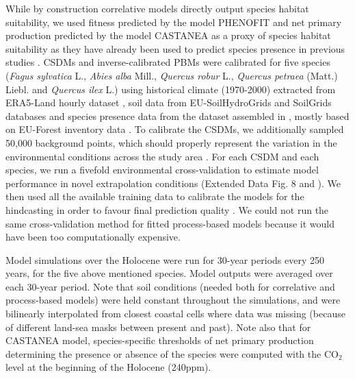 \documentclass[pdflatex, sn-nature]{sn-jnl}%
\newcommand{\textappr}{\raisebox{0.5ex}{\texttildelow}} %
\begin{document}
While by construction correlative models directly output species habitat suitability, we used fitness predicted by the model PHENOFIT and net primary production predicted by the model CASTANEA as a proxy of species habitat suitability as they have already been used to predict species presence in previous studies \cite{Morin2009, Cheaib2012, Saltre2013}. 
CSDMs and inverse-calibrated PBMs were calibrated for five species (\textit{Fagus sylvatica} L., \textit{Abies alba} Mill., \textit{Quercus robur} L., \textit{Quercus petraea}  (Matt.) Liebl. and \textit{Quercus ilex} L.) using historical climate (1970-2000) extracted from ERA5-Land hourly dataset \cite{MunozSabater2021}, soil data from EU-SoilHydroGrids \cite{Toth2017} and SoilGrids \cite{Hengl2017} databases and species presence data from the dataset assembled in \cite{VanderMeersch2023}, mostly based on EU-Forest inventory data \cite{Mauri2017}. To calibrate the CSDMs, we additionally sampled 50,000 background points, which should properly represent the variation in the environmental conditions across the study area \cite{Valavi2022}. For each CSDM and each species, we run a fivefold environmental cross-validation to estimate model performance in novel extrapolation conditions (Extended Data Fig. 8 and \cite{Roberts2017}). We then used all the available training data to calibrate the models for the hindcasting in order to favour final prediction quality \cite{Roberts2017}. We could not run the same cross-validation method for fitted process-based models because it would have been too computationally expensive. 

Model simulations over the Holocene were run for 30-year periods every 250 years, for the five above mentioned species. Model outputs were averaged over each 30-year period. Note that soil conditions (needed both for correlative and process-based models) were held constant throughout the simulations, and were bilinearly interpolated from closest coastal cells where data was missing (because of different land-sea masks between present and past). Note also that for CASTANEA model, species-specific thresholds of net primary production determining the presence or absence of the species were computed with the CO$_2$ level at the beginning of the Holocene (\textappr240ppm).
\end{document}
